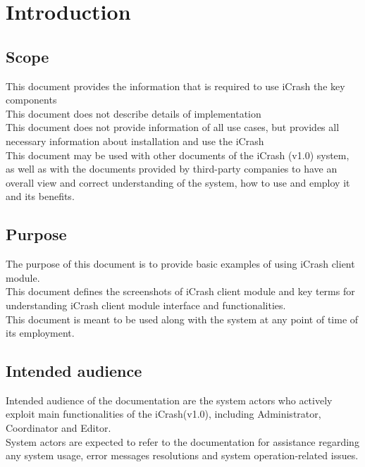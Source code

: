 \chapter{Introduction}
\label{chap:introduction}

\section{Scope}
This document provides the information that is required to use iCrash  the key
components \\
\newline
This document does not describe details of implementation \\
\newline
This document does not provide information of all use cases, but provides all
necessary information about installation and use the iCrash\\
\newline
This document may
be used with other documents of the iCrash (v1.0) system, as well as with the documents provided by third-party companies to have an overall view and correct understanding of the system, how to use and employ it and its benefits.
\newline
\section{Purpose}
The purpose of this document is to provide basic examples of using iCrash client
module. \\
\newline
This document defines the screenshots of iCrash client module and key terms for
understanding iCrash client module interface and functionalities. \\
\newline
This document is meant to be used along with the system at any point of
time of its employment.
\newline
\section{Intended audience}
Intended audience of the documentation are the system actors who actively
exploit main functionalities of the iCrash(v1.0), including Administrator,
Coordinator and Editor.\\
\newline
System actors are expected to refer to the documentation for assistance
regarding any system usage, error messages resolutions and system
operation-related issues.
\newline
